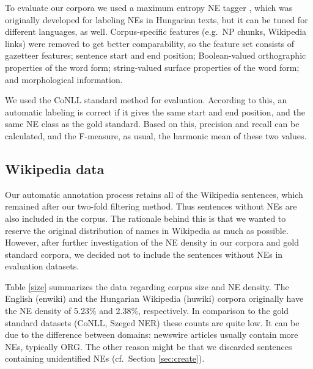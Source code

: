 \documentclass[11pt]{article}
\begin{document}
To evaluate our corpora we used a maximum entropy NE tagger \cite{Varga:07}, which was originally developed for labeling NEs in Hungarian texts, but it can be tuned for different languages, as well. Corpus-specific features (e.g.~NP chunks, Wikipedia links) were removed to get better comparability, so the feature set consists of gazetteer features; sentence start and end position; Boolean-valued orthographic properties of the word form; string-valued surface properties of the word form; and morphological information.


We used the CoNLL standard method for evaluation. According to this, an automatic labeling is correct if it gives the same start and end position, and the same NE class as the gold standard. Based on this, precision and recall can be calculated, and the F-measure, as usual, the harmonic mean of these two values.  

\subsection{Wikipedia data}

Our automatic annotation process retains all of the Wikipedia sentences, which remained after our two-fold filtering method. Thus sentences without NEs are also included in the corpus. The rationale behind this is that we wanted to reserve the original distribution of names in Wikipedia as much as possible. However, after further investigation of the NE density in our corpora and gold standard corpora, we decided not to include the sentences without NEs in evaluation datasets. 

Table \ref{size} summarizes the data regarding corpus size and NE density. The English (enwiki) and the Hungarian Wikipedia (huwiki) corpora originally have the NE density of 5.23\% and 2.38\%, respectively. In comparison to the gold standard datasets (CoNLL, Szeged NER) these counts are quite low. It can be due to the difference between domains: newswire articles usually contain more NEs, typically ORG. The other reason might be that we discarded sentences containing unidentified NEs (cf.~Section \ref{sec:create}).    
\end{document}

